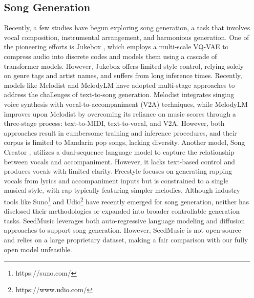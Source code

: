 \subsection{Song Generation}

Recently, a few studies have begun exploring song generation, a task that involves vocal composition, instrumental arrangement, and harmonious generation.
One of the pioneering efforts is Jukebox \cite{dhariwal2020jukebox}, which employs a multi-scale VQ-VAE to compress audio into discrete codes and models them using a cascade of transformer models.
However, Jukebox offers limited style control, relying solely on genre tags and artist names, and suffers from long inference times.
Recently, models like Melodist \cite{hong2024Melodist} and MelodyLM \cite{li2024melodyLM} have adopted multi-stage approaches to address the challenges of text-to-song generation. Melodist integrates singing voice synthesis with vocal-to-accompaniment (V2A) techniques, while MelodyLM improves upon Melodist by overcoming its reliance on music scores through a three-stage process: text-to-MIDI, text-to-vocal, and V2A. However, both approaches result in cumbersome training and inference procedures, and their corpus is limited to Mandarin pop songs, lacking diversity.
Another model, Song Creator \cite{lei2024songcreator}, utilizes a dual-sequence language model to capture the relationship between vocals and accompaniment. However, it lacks text-based control and produces vocals with limited clarity. 
Freestyle \cite{ning2024freestyler} focuses on generating rapping vocals from lyrics and accompaniment inputs but is constrained to a single musical style, with rap typically featuring simpler melodies.
Although industry tools like Suno\footnote{https://suno.com/} and Udio\footnote{https://www.udio.com/} have recently emerged for song generation, neither has disclosed their methodologies or expanded into broader controllable generation tasks. SeedMusic \cite{bai2024seedmusic} leverages both auto-regressive language modeling and diffusion approaches to support song generation. However, SeedMusic is not open-source and relies on a large proprietary dataset, making a fair comparison with our fully open model unfeasible.

